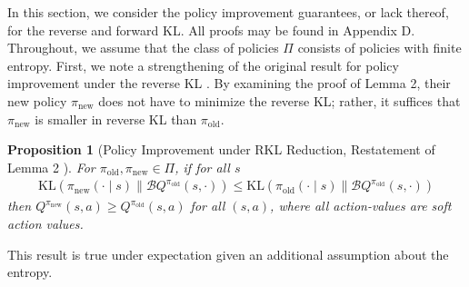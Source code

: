 \documentclass{article}
\newcommand{\KL}{\mathrm{KL}}
\newcommand{\boltzmannQ}{\mathcal{B}Q}
\newcommand{\pinew}{{\pi_\mathrm{new}}}
\newcommand{\piold}{{\pi_\mathrm{old}}}
\newtheorem{proposition}{Proposition}
\begin{document}
In this section, we consider the policy improvement guarantees, or lack thereof, for the reverse and forward KL. %
All proofs may be found in Appendix D. 
Throughout, we assume that the class of policies $\Pi$ consists of policies with finite entropy. First, we note a strengthening of the original result for policy improvement under the reverse KL \citep{haarnoja2018soft}. By examining the proof of Lemma 2, their new policy $\pi_{\mathrm{new}}$ does not have to minimize the reverse KL; rather, it suffices that $\pi_{\mathrm{new}}$ is smaller in reverse KL than $\pi_{\mathrm{old}}$. 
\begin{proposition}[Policy Improvement under RKL Reduction, Restatement of Lemma 2 \citep{haarnoja2018soft}]\label{lem:stronger-sac}
For $\piold, \pinew \in \Pi$, if for all $s$
\begin{align*}
    \KL(\pinew(\cdot \mid s) \parallel \boltzmannQ^\piold(s, \cdot)) \le \KL(\piold(\cdot \mid s) \parallel \boltzmannQ^\piold(s, \cdot))\nonumber
\end{align*}
then $Q^\pinew(s, a) \geq Q^\piold(s, a)$ for all $(s, a)$, where all action-values are soft action values. 
\end{proposition}

This result is true under expectation given an additional assumption about the entropy.
\end{document}
